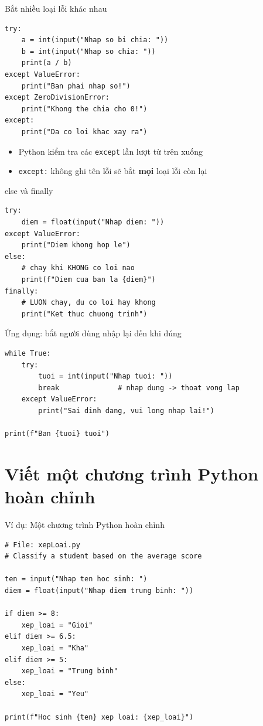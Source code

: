 \documentclass[11pt]{beamer}
\begin{document}
\begin{frame}[fragile]{Bắt nhiều loại lỗi khác nhau}
\begin{lstlisting}
try:
    a = int(input("Nhap so bi chia: "))
    b = int(input("Nhap so chia: "))
    print(a / b)
except ValueError:
    print("Ban phai nhap so!")
except ZeroDivisionError:
    print("Khong the chia cho 0!")
except:
    print("Da co loi khac xay ra")
\end{lstlisting}
\begin{itemize}
  \item Python kiểm tra các \texttt{except} lần lượt từ trên xuống
  \item \texttt{except:} không ghi tên lỗi sẽ bắt \textbf{mọi} loại lỗi còn lại
\end{itemize}
\end{frame}

\begin{frame}[fragile]{else và finally}
\begin{lstlisting}
try:
    diem = float(input("Nhap diem: "))
except ValueError:
    print("Diem khong hop le")
else:
    # chay khi KHONG co loi nao
    print(f"Diem cua ban la {diem}")
finally:
    # LUON chay, du co loi hay khong
    print("Ket thuc chuong trinh")
\end{lstlisting}
\end{frame}

\begin{frame}[fragile]{Ứng dụng: bắt người dùng nhập lại đến khi đúng}
\begin{lstlisting}
while True:
    try:
        tuoi = int(input("Nhap tuoi: "))
        break              # nhap dung -> thoat vong lap
    except ValueError:
        print("Sai dinh dang, vui long nhap lai!")

print(f"Ban {tuoi} tuoi")
\end{lstlisting}
\end{frame}

\section{Viết một chương trình Python hoàn chỉnh}

\begin{frame}[fragile]{Ví dụ: Một chương trình Python hoàn chỉnh}
\begin{lstlisting}
# File: xepLoai.py
# Classify a student based on the average score

ten = input("Nhap ten hoc sinh: ")
diem = float(input("Nhap diem trung binh: "))

if diem >= 8:
    xep_loai = "Gioi"
elif diem >= 6.5:
    xep_loai = "Kha"
elif diem >= 5:
    xep_loai = "Trung binh"
else:
    xep_loai = "Yeu"

print(f"Hoc sinh {ten} xep loai: {xep_loai}")
\end{lstlisting}
\end{frame}
\end{document}
